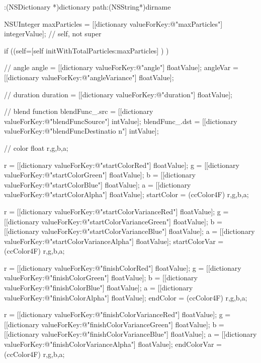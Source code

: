 \begin{DoxyCode}
                        :(NSDictionary *)dictionary path:(NSString*)dirname
{
        NSUInteger maxParticles = [[dictionary valueForKey:@"maxParticles"] 
      integerValue];
        // self, not super

        if ((self=[self initWithTotalParticles:maxParticles] ) )
        {
                // angle
                angle = [[dictionary valueForKey:@"angle"] floatValue];
                angleVar = [[dictionary valueForKey:@"angleVariance"] 
      floatValue];

                // duration
                duration = [[dictionary valueForKey:@"duration"] floatValue];

                // blend function
                blendFunc_.src = [[dictionary valueForKey:@"blendFuncSource"] 
      intValue];
                blendFunc_.dst = [[dictionary valueForKey:@"blendFuncDestinatio
      n"] intValue];

                // color
                float r,g,b,a;

                r = [[dictionary valueForKey:@"startColorRed"] floatValue];
                g = [[dictionary valueForKey:@"startColorGreen"] floatValue];
                b = [[dictionary valueForKey:@"startColorBlue"] floatValue];
                a = [[dictionary valueForKey:@"startColorAlpha"] floatValue];
                startColor = (ccColor4F) {r,g,b,a};

                r = [[dictionary valueForKey:@"startColorVarianceRed"] 
      floatValue];
                g = [[dictionary valueForKey:@"startColorVarianceGreen"] 
      floatValue];
                b = [[dictionary valueForKey:@"startColorVarianceBlue"] 
      floatValue];
                a = [[dictionary valueForKey:@"startColorVarianceAlpha"] 
      floatValue];
                startColorVar = (ccColor4F) {r,g,b,a};

                r = [[dictionary valueForKey:@"finishColorRed"] floatValue];
                g = [[dictionary valueForKey:@"finishColorGreen"] floatValue];
                b = [[dictionary valueForKey:@"finishColorBlue"] floatValue];
                a = [[dictionary valueForKey:@"finishColorAlpha"] floatValue];
                endColor = (ccColor4F) {r,g,b,a};

                r = [[dictionary valueForKey:@"finishColorVarianceRed"] 
      floatValue];
                g = [[dictionary valueForKey:@"finishColorVarianceGreen"] 
      floatValue];
                b = [[dictionary valueForKey:@"finishColorVarianceBlue"] 
      floatValue];
                a = [[dictionary valueForKey:@"finishColorVarianceAlpha"] 
      floatValue];
                endColorVar = (ccColor4F) {r,g,b,a};

}}
\end{DoxyCode}
